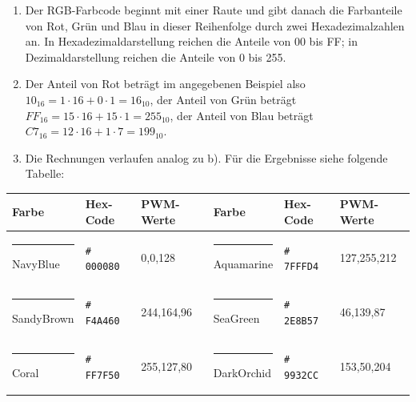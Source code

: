 \documentclass[ngerman, 11pt]{scrreprt}
\begin{document}
	\begin{enumerate}[label=\alph*), itemsep=0mm, parsep=0mm]
		\item Der RGB-Farbcode beginnt mit einer Raute und gibt danach die Farbanteile von Rot, Grün und Blau in dieser Reihenfolge durch zwei Hexadezimalzahlen an. In Hexadezimaldarstellung reichen die Anteile von 00 bis FF; in Dezimaldarstellung reichen die Anteile von 0 bis 255.
		\item Der Anteil von Rot beträgt im angegebenen Beispiel also $10_{16}=1\cdot 16 + 0 \cdot 1 = 16_{10}$, der Anteil von Grün beträgt $FF_{16}=15\cdot 16 + 15\cdot 1 = 255_{10}$, der Anteil von Blau beträgt $C7_{16}=12\cdot 16+ 1\cdot 7=199_{10}$.
		\item Die Rechnungen verlaufen analog zu b). Für die Ergebnisse siehe folgende Tabelle:
	\end{enumerate}
	\vspace{-\baselineskip}
	\begin{table}[H]
		\centering
		\begin{minipage}[c]{\textwidth}
			\begin{tabu} to \textwidth {X[L,2]X[L]X[L]|X[L,2]X[L]X[L]}
				\toprule
				\textbf{Farbe} & \textbf{Hex-Code} & \textbf{PWM-Werte} & \textbf{Farbe} & \textbf{Hex-Code} & \textbf{PWM-Werte} \\
				\midrule
				\textcolor{navyblue}{\rule{1cm}{0.4cm}} NavyBlue	& \texttt{\# 000080} & 0,0,128 & \textcolor{aquamarine}{\rule{1cm}{0.4cm}} Aquamarine & \texttt{\# 7FFFD4} & 127,255,212 \\ 
				\textcolor{sandybrown}{\rule{1cm}{0.4cm}} SandyBrown	& \texttt{\# F4A460} & 244,164,96 & \textcolor{seagreen}{\rule{1cm}{0.4cm}} SeaGreen & \texttt{\# 2E8B57} & 46,139,87 \\
				\textcolor{coral}{\rule{1cm}{0.4cm}} Coral	& \texttt{\# FF7F50} & 255,127,80 & \textcolor{darkorchid}{\rule{1cm}{0.4cm}} DarkOrchid & \texttt{\# 9932CC} & 153,50,204 \\
				\bottomrule
			\end{tabu}
		\end{minipage}
		\label{tab:rgb-codes4}
	\end{table}
	
\end{document}
